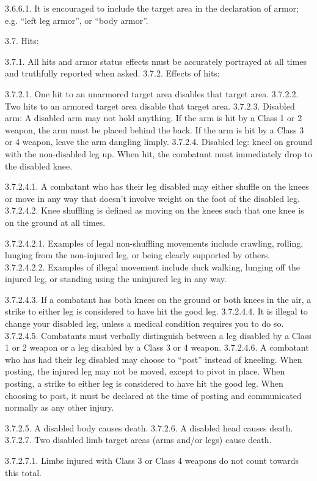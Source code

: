 \documentclass[12pt]{article}
\begin{document}
\begin{level}[start=0]
3.6.6.1. It is encouraged to include the target area in the declaration of armor; e.g. “left leg armor”, or “body armor”.

3.7. Hits:

3.7.1. All hits and armor status effects must be accurately portrayed at all times and truthfully reported when asked.
3.7.2. Effects of hits:

3.7.2.1. One hit to an unarmored target area disables that target area.
3.7.2.2. Two hits to an armored target area disable that target area.
3.7.2.3. Disabled arm: A disabled arm may not hold anything. If the arm is hit by a Class 1 or 2 weapon, the arm must be placed behind the back. If the arm is hit by a Class 3 or 4 weapon, leave the arm dangling limply.
3.7.2.4. Disabled leg: kneel on ground with the non-disabled leg up. When hit, the combatant must immediately drop to the disabled knee.

3.7.2.4.1. A combatant who has their leg disabled may either shuffle on the knees or move in any way that doesn’t involve weight on the foot of the disabled leg.
3.7.2.4.2. Knee shuffling is defined as moving on the knees such that one knee is on the ground at all times.

3.7.2.4.2.1. Examples of legal non-shuffling movements include crawling, rolling, lunging from the non-injured leg, or being clearly supported by others.
3.7.2.4.2.2. Examples of illegal movement include duck walking, lunging off the injured leg, or standing using the uninjured leg in any way.

3.7.2.4.3. If a combatant has both knees on the ground or both knees in the air, a strike to either leg is considered to have hit the good leg.
3.7.2.4.4. It is illegal to change your disabled leg, unless a medical condition requires you to do so.
3.7.2.4.5. Combatants must verbally distinguish between a leg disabled by a Class 1 or 2 weapon or a leg disabled by a Class 3 or 4 weapon.
3.7.2.4.6. A combatant who has had their leg disabled may choose to “post” instead of kneeling. When posting, the injured leg may not be moved, except to pivot in place. When posting, a strike to either leg is considered to have hit the good leg. When choosing to post, it must be declared at the time of posting and communicated normally as any other injury.

3.7.2.5. A disabled body causes death.
3.7.2.6. A disabled head causes death.
3.7.2.7. Two disabled limb target areas (arms and/or legs) cause death.

3.7.2.7.1. Limbs injured with Class 3 or Class 4 weapons do not count towards this total.


\end{level}
\end{document}
